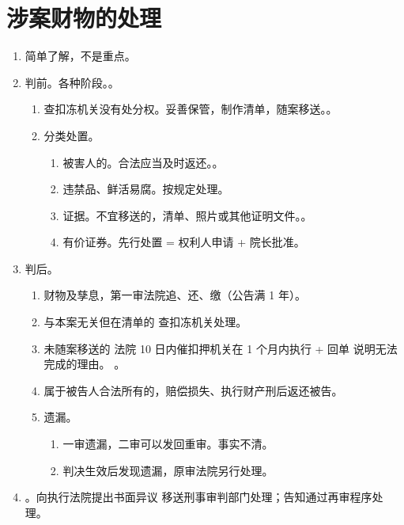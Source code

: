 \section{涉案财物的处理}
\begin{enumerate}
  \item 简单了解，不是重点。
  \item 判前。各种阶段。。
        \begin{enumerate}
          \item 查扣冻机关没有处分权。妥善保管，制作清单，随案移送。。
          \item 分类处置。
                \begin{enumerate}
                  \item 被害人的。合法应当及时返还。。
                  \item 违禁品、鲜活易腐。按规定处理。
                  \item 证据。不宜移送的，清单、照片或其他证明文件。。
                  \item 有价证券。先行处置 = 权利人申请 + 院长批准。
                \end{enumerate}
        \end{enumerate}
  \item 判后。
        \begin{enumerate}
          \item 财物及孳息，第一审法院追、还、缴（公告满 1 年）。
          \item 与本案无关但在清单的 \yjt 查扣冻机关处理。
          \item 未随案移送的 \yjt 法院 10 日内催扣押机关在 1 个月内执行 + 回单 \hz 说明无法完成的理由。
                。
          \item 属于被告人合法所有的，赔偿损失、执行财产刑后返还被告。
          \item 遗漏。
                \begin{enumerate}
                  \item 一审遗漏，二审可以发回重审。\ydy 事实不清。
                  \item 判决生效后发现遗漏，原审法院另行处理。
                \end{enumerate}
        \end{enumerate}
  \item {}。向执行法院提出书面异议 \yjt 移送刑事审判部门处理；告知通过再审程序处理。
\end{enumerate}
